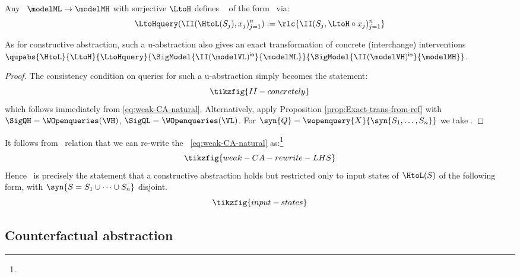 \documentclass{article}
\begin{document}
\begin{corollary}
Any \rl{\restrictedCCA}\ 
$\modelML \to \modelMH$ 
with surjective $\LtoH$ 
defines \ \qup{} of the form 
\rl{$\qupabs{\HtoL}{\LtoH}{\LtoHquery}{\SigModel{\II(\modelVL)}{\modelML}}{\SigModel{\II(\modelVH)}{\modelMH}}$}\ via: 
\[
\LtoHquery ( \II(\HtoL(S_j), x_j)^n_{j=1}) :=  \rlc{\II(S_j,\LtoH \circ x_j)^n_{j=1}}
\]
\end{corollary}

As for constructive abstraction, such a u-abstraction also gives an exact transformation of concrete (interchange) interventions $\qupabs{\HtoL}{\LtoH}{\LtoHquery}
{\SigModel{\II(\modelVL)^{\mathsf{io}}}{\modelML}}
{\SigModel{\II(\modelVH)^{\mathsf{io}}}{\modelMH}}$.

\begin{proof}
The consistency condition on queries for such a u-abstraction simply becomes the statement: 
\begin{equation} \label{eq:interchange-ints} 
\tikzfig{II-concretely}
\end{equation}
which follows immediately from \eqref{eq:weak-CA-natural}. Alternatively, apply Proposition \ref{prop:Exact-trans-from-ref} with 
$\SigQH=\WOpenqueries(\VH)$, $\SigQL=\WOpenqueries(\VL)$. For $\syn{Q} = \wopenquery{X}{\syn{S_1,\dots,S_n}}$ we take . 
\end{proof}

\begin{remark} \label{remark:alt-view-weak-abstraction}
It follows from \ relation that we can re-write the \ \eqref{eq:weak-CA-natural} as:\footnote{} 
\[
\tikzfig{weak-CA-rewrite-LHS}
\]
Hence \ is precisely the statement that a constructive abstraction holds but restricted only to input states of $\HtoL(S)$ of the following form, with $\syn{S = S_1 \cup \dots \cup S_n}$ disjoint. 
\begin{equation} \label{eq:weak-abs-inputs}
\tikzfig{input-states}
\end{equation} 
\end{remark}

\subsection{Counterfactual abstraction} \label{subsec:CF-abstraction}
\end{document}
